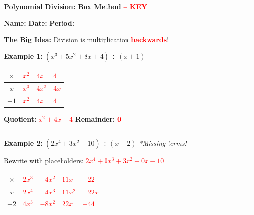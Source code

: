 \documentclass[14pt]{extarticle}
\newcommand{\ans}[1]{\textcolor{red}{\textbf{#1}}}
\begin{document}
\begin{center}
    \LARGE\textbf{Polynomial Division: Box Method} \ans{-- KEY}
\end{center}
\textbf{Name:} \underline{\hspace{2in}} \hfill \textbf{Date:} \underline{\hspace{1in}} \hfill \textbf{Period:} \underline{\hspace{0.5in}}

\vspace{0.15cm}

\begin{tcolorbox}[colback=gray!15, colframe=black, boxrule=0.5pt, arc=3pt]
\textbf{The Big Idea:} Division is multiplication \ans{backwards}!
\end{tcolorbox}

\vspace{0.2cm}

\textbf{Example 1:} \quad $(x^3 + 5x^2 + 8x + 4) \div (x + 1)$

\vspace{0.2cm}
\begin{center}
\renewcommand{\arraystretch}{2.5}
\large
\begin{tabular}{|c||p{0.8in}|p{0.8in}|p{0.8in}|}
\hline
$\times$ & \ans{$x^2$} & \ans{$4x$} & \ans{$4$} \\
\hline\hline
$x$ & \ans{$x^3$} & \ans{$4x^2$} & \ans{$4x$} \\
\hline
$+1$ & \ans{$x^2$} & \ans{$4x$} & \ans{$4$} \\
\hline
\end{tabular}
\end{center}

\vspace{0.1cm}
\textbf{Quotient:} \ans{$x^2 + 4x + 4$} \hfill \textbf{Remainder:} \ans{0}

\vspace{0.25cm}
\hrule
\vspace{0.3cm}

\textbf{Example 2:} \quad $(2x^4 + 3x^2 - 10) \div (x + 2)$ \hfill \textit{*Missing terms!}

\vspace{0.15cm}
Rewrite with placeholders: \ans{$2x^4 + 0x^3 + 3x^2 + 0x - 10$}

\vspace{0.2cm}
\begin{center}
\renewcommand{\arraystretch}{2.3}
\large
\begin{tabular}{|c||p{0.6in}|p{0.6in}|p{0.6in}|p{0.6in}|}
\hline
$\times$ & \ans{$2x^3$} & \ans{$-4x^2$} & \ans{$11x$} & \ans{$-22$} \\
\hline\hline
$x$ & \ans{$2x^4$} & \ans{$-4x^3$} & \ans{$11x^2$} & \ans{$-22x$} \\
\hline
$+2$ & \ans{$4x^3$} & \ans{$-8x^2$} & \ans{$22x$} & \ans{$-44$} \\
\hline
\end{tabular}
\end{center}
\end{document}
